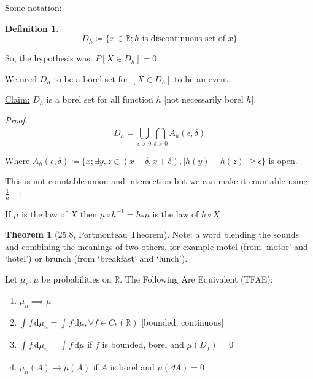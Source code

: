 \documentclass{article}
\theoremstyle{definition}
\newtheorem{definition}{Definition}
\newtheorem{theorem}{Theorem}
\begin{document}
Some notation:

\begin{definition}
    \[
        D_h \coloneqq \{ x\in \mathbb{R} ; h \text{ is discontinuous set of } x \} 
    \] 
\end{definition}

So, the hypothesis was: \(P[X\in D_h]=0\) 

We need \(D_h\) to be a borel set for \([X\in D_h]\) to be an event.

\underline{Claim:} \(D_h\) is a borel set for all function \(h\) [not necessarily borel \(h\)].

\begin{proof}
    \[
        D_h = \bigcup_{\epsilon > 0}^{} \bigcap_{\delta > 0} A_h(\epsilon , \delta) 
    \]

    Where \(A_h(\epsilon ,\delta)\coloneqq \{ x; \exists y,z \in (x-\delta ,x+\delta ), \vert h(y)-h(z) \vert \geq \epsilon \} \) is open.

    This is not countable union and intersection but we can make it countable using \(\frac{1}{n}\) 

\end{proof}

If \(\mu \) is the law of \(X\) then \(\mu \circ h^{-1}=h_\ast \mu\) is the law of \(h\circ X\) 

\begin{theorem}[25.8, Portmonteau Theorem]

    Note: a word blending the sounds and combining the meanings of two others, for example motel (from `motor' and `hotel') or brunch (from `breakfast' and `lunch').

    Let \(\mu_n,\mu\) be probabilities on \(\mathbb{R}\). The Following Are Equivalent (TFAE):

    \begin{enumerate}
        \item \(\mu_n \implies \mu\) 
        \item \(\int_{}^{} f \,\mathrm{d}\mu_n = \int_{}^{} f \,\mathrm{d}\mu , \forall f\in C_b(\mathbb{R})\) [bounded, continuous]
        \item \(\int_{}^{} f \,\mathrm{d}\mu_n = \int_{}^{} f \,\mathrm{d}\mu\) if \(f\) is bounded, borel and \(\mu(D_f)=0\)
        \item \(\mu_n(A)\to \mu(A)\) if \(A\) is borel and \(\mu(\partial A) = 0\)
    \end{enumerate}

\end{theorem}
\end{document}
